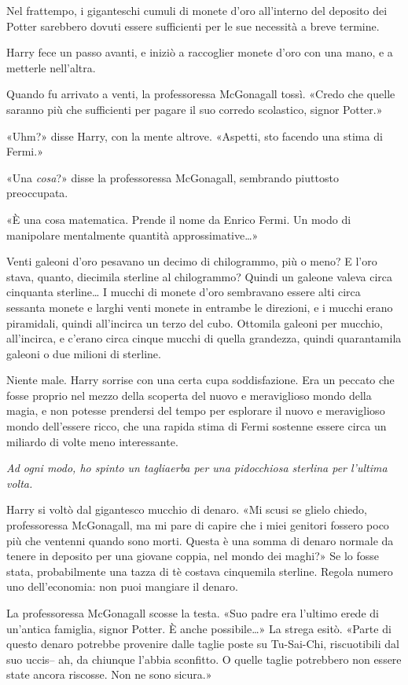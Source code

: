 Nel frattempo, i giganteschi cumuli di monete d’oro all’interno del deposito dei Potter sarebbero dovuti essere sufficienti per le sue necessità a breve termine.

Harry fece un passo avanti, e iniziò a raccoglier monete d’oro con una mano, e a metterle nell’altra.

Quando fu arrivato a venti, la professoressa McGonagall tossì. «Credo che quelle saranno più che sufficienti per pagare il suo corredo scolastico, signor Potter.»

«Uhm?» disse Harry, con la mente altrove. «Aspetti, sto facendo una stima di Fermi.»

«Una \textit{cosa}?» disse la professoressa McGonagall, sembrando piuttosto preoccupata.

«È una cosa matematica. Prende il nome da Enrico Fermi. Un modo di manipolare mentalmente quantità approssimative…»

Venti galeoni d’oro pesavano un decimo di chilogrammo, più o meno? E l’oro stava, quanto, diecimila sterline al chilogrammo? Quindi un galeone valeva circa cinquanta sterline… I mucchi di monete d’oro sembravano essere alti circa sessanta monete e larghi venti monete in entrambe le direzioni, e i mucchi erano piramidali, quindi all’incirca un terzo del cubo. Ottomila galeoni per mucchio, all’incirca, e c’erano circa cinque mucchi di quella grandezza, quindi quarantamila galeoni o due milioni di sterline.

Niente male. Harry sorrise con una certa cupa soddisfazione. Era un peccato che fosse proprio nel mezzo della scoperta del nuovo e meraviglioso mondo della magia, e non potesse prendersi del tempo per esplorare il nuovo e meraviglioso mondo dell’essere ricco, che una rapida stima di Fermi sostenne essere circa un miliardo di volte meno interessante.

\textit{Ad ogni modo, ho spinto un tagliaerba per una pidocchiosa sterlina per l’ultima volta.}

Harry si voltò dal gigantesco mucchio di denaro. «Mi scusi se glielo chiedo, professoressa McGonagall, ma mi pare di capire che i miei genitori fossero poco più che ventenni quando sono morti. Questa è una somma di denaro normale da tenere in deposito per una giovane coppia, nel mondo dei maghi?» Se lo fosse stata, probabilmente una tazza di tè costava cinquemila sterline. Regola numero uno dell’economia: non puoi mangiare il denaro.

La professoressa McGonagall scosse la testa. «Suo padre era l’ultimo erede di un’antica famiglia, signor Potter. È anche possibile…» La strega esitò. «Parte di questo denaro potrebbe provenire dalle taglie poste su Tu-Sai-Chi, riscuotibili dal suo uccis– ah, da chiunque l’abbia sconfitto. O quelle taglie potrebbero non essere state ancora riscosse. Non ne sono sicura.»

